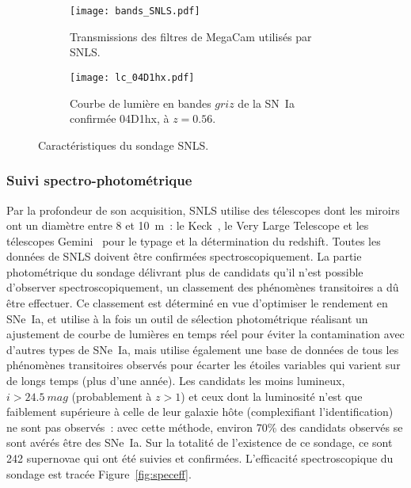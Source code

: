\documentclass[../main/main.tex]{subfiles}
\begin{document}
\begin{figure}[h]
    \centering
    \begin{subfigure}[]{.49\linewidth}
        \centering
        \texttt{[image: bands\_SNLS.pdf]}
        \captionsetup{justification=centering}
        \caption{Transmissions des filtres de MegaCam utilisés par SNLS.}
        \label{fig:snlsbands}
    \end{subfigure}
    \begin{subfigure}[]{.49\linewidth}
        \centering
        \texttt{[image: lc\_04D1hx.pdf]}
        \captionsetup{justification=centering}
        \caption{Courbe de lumière en bandes $griz$ de la SN~Ia confirmée
        04D1hx, à $z = 0.56$.}
        \label{fig:snlslc}
    \end{subfigure}
    \caption{Caractéristiques du sondage SNLS.}
\end{figure}

\subsubsection{Suivi spectro-photométrique}\label{sssec:snlsspectro}

Par la profondeur de son acquisition, SNLS utilise des télescopes dont les
miroirs ont un diamètre entre 8 et \SI{10}{m}~: le Keck~\citep{oke1995,
ellis2008}, le Very Large Telescope \citep[VLT,][]{balland2009} et les
télescopes Gemini~\citep{hook2004} pour le typage et la détermination du
redshift. Toutes les données de SNLS doivent être confirmées
spectroscopiquement. La partie photométrique du sondage délivrant plus de
candidats qu'il n'est possible d'observer spectroscopiquement, un classement des
phénomènes transitoires a dû être effectuer. Ce classement est déterminé en vue
d'optimiser le rendement en SNe~Ia, et utilise à la fois un outil de sélection
photométrique réalisant un ajustement de courbe de lumières en temps réel pour
éviter la contamination avec d'autres types de SNe~Ia, mais utilise également
une base de données de tous les phénomènes transitoires observés pour écarter
les étoiles variables qui varient sur de longs temps (plus d'une année). Les
candidats les moins lumineux, $i > \SI{24.5}{mag}$ (probablement à $z > 1$) et
ceux dont la luminosité n'est que faiblement supérieure à celle de leur galaxie
hôte (complexifiant l'identification) ne sont pas observés~: avec cette méthode,
environ 70\% des candidats observés se sont avérés être des SNe~Ia. Sur la
totalité de l'existence de ce sondage, ce sont 242 supernovae qui ont été
suivies et confirmées. L'efficacité spectroscopique du sondage est tracée
Figure~\ref{fig:speceff}.
\end{document}
